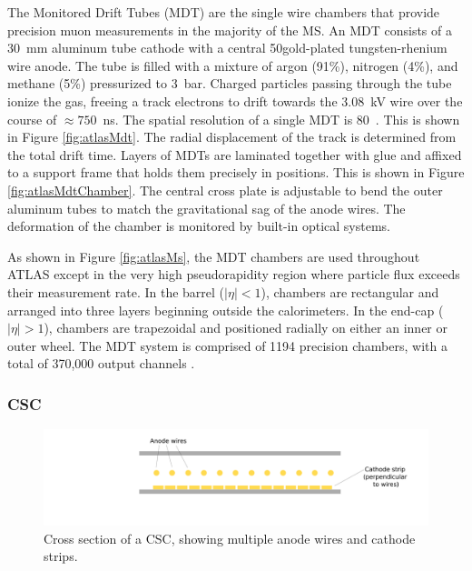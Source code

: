 The Monitored Drift Tubes (MDT) are the single wire chambers that provide precision muon measurements in the majority of the MS.
An MDT consists of a 30~mm aluminum tube cathode with a central 50\um gold-plated tungsten-rhenium wire anode.
The tube is filled with a mixture of argon (91\%), nitrogen (4\%), and methane (5\%) pressurized to 3~bar.
Charged particles passing through the tube ionize the gas, freeing a track electrons to drift towards the 3.08~kV wire over the course of $\approx750$~ns.
The spatial resolution of a single MDT is 80~\um.
This is shown in Figure \ref{fig:atlasMdt}.
The radial displacement of the track is determined from the total drift time.
Layers of MDTs are laminated together with glue and affixed to a support frame that holds them precisely in positions.
This is shown in Figure \ref{fig:atlasMdtChamber}.
The central cross plate is adjustable to bend the outer aluminum tubes to match the gravitational sag of the anode wires.
The deformation of the chamber is monitored by built-in optical systems.

As shown in Figure \ref{fig:atlasMs}, the MDT chambers are used throughout ATLAS except in the very high pseudorapidity region where particle flux exceeds their measurement rate.
In the barrel ($|\eta|<1$), chambers are rectangular and arranged into three layers beginning outside the calorimeters.
In the end-cap ($|\eta|>1$), chambers are trapezoidal and positioned radially on either an inner or outer wheel.
The MDT system is comprised of 1194 precision chambers, with a total of 370,000 output channels  \cite{muonTdr}.

\subsubsection{CSC} %

\begin{figure}[h!]
\captionsetup[subfigure]{position=b}
\centering
\includegraphics[width=1.0\textwidth]{figures/experiment/mdt/csc.pdf}
\caption{Cross section of a CSC, showing multiple anode wires and cathode strips.}
\label{fig:atlasCsc}
\end{figure}

